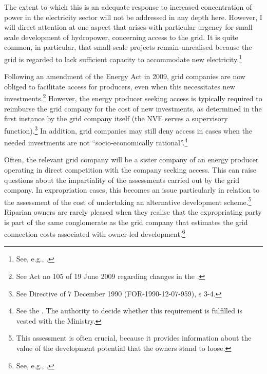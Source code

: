 The extent to which this is an adequate response to increased concentration of power in the electricity sector will not be addressed in any depth here. However, I will direct attention at one aspect that arises with particular urgency for small-scale development of hydropower, concerning access to the grid. It is quite common, in particular, that small-scale projects remain unrealised because the grid is regarded to lack sufficient capacity to accommodate new electricity.\footnote{See, e.g., \cite[84,161-162]{nou129}.}

Following an amendment of the Energy Act in 2009, grid companies are now obliged to facilitate access for producers, even when this necessitates new investments.\footnote{See Act no 105 of 19 June 2009 regarding changes in the \cite{ea90}.} However, the energy producer seeking access is typically required to reimburse the grid company for the cost of new investments, as determined in the first instance by the grid company itself (the NVE serves a supervisory function).\footnote{See Directive of 7 December 1990 (FOR-1990-12-07-959), s 3-4.} In addition, grid companies may still deny access in cases when the needed investments are not ``socio-economically rational''.\footnote{See the \dni\cite[3-4]{ea90}. The authority to decide whether this requirement is fulfilled is vested with the Ministry.}

Often, the relevant grid company will be a sister company of an energy producer operating in direct competition with the company seeking access. This can raise questions about the impartiality of the assessments carried out by the grid company. In expropriation cases, this becomes an issue particularly in relation to the assessment of the cost of undertaking an alternative development scheme.\footnote{This assessment is often crucial, because it provides information about the value of the development potential that the owners stand to loose.} Riparian owners are rarely pleased when they realise that the expropriating party is part of the same conglomerate as the grid company that estimates the grid connection costs associated with owner-led development.\footnote{See, e.g., \cite{smibelg15}.}

